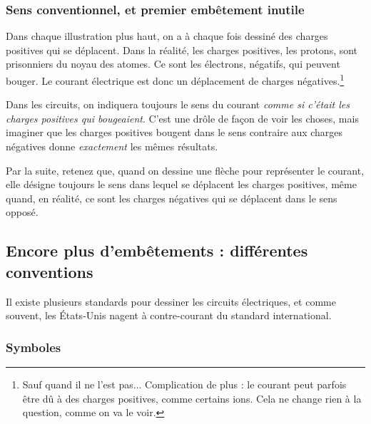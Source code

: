 \documentclass{article}
\begin{document}
\subsubsection{Sens conventionnel, et premier embêtement inutile}

Dans chaque illustration plus haut, on a à chaque fois dessiné des charges positives qui se déplacent. Dans la réalité, les charges positives, les protons, sont prisonniers du noyau des atomes. Ce sont les électrons, négatifs, qui peuvent bouger. Le courant électrique est donc un déplacement de charges négatives.\footnote{Sauf quand il ne l'est pas... Complication de plus : le courant peut parfois être dû à des charges positives, comme certains ions. Cela ne change rien à la question, comme on va le voir.}

Dans les circuits, on indiquera toujours le sens du courant \emph{comme si c'était les charges positives qui bougeaient}. C'est une drôle de façon de voir les choses, mais imaginer que les charges positives bougent dans le sens contraire aux charges négatives donne \emph{exactement} les mêmes résultats.

Par la suite, retenez que, quand on dessine une flèche pour représenter le courant, elle désigne toujours le sens dans lequel se déplacent les charges positives, même quand, en réalité, ce sont les charges négatives qui se déplacent dans le sens opposé.

\subsection{Encore plus d'embêtements : différentes conventions}

Il existe plusieurs standards pour dessiner les circuits électriques, et comme souvent, les États-Unis nagent à contre-courant du standard international.

\subsubsection{Symboles}
\end{document}
